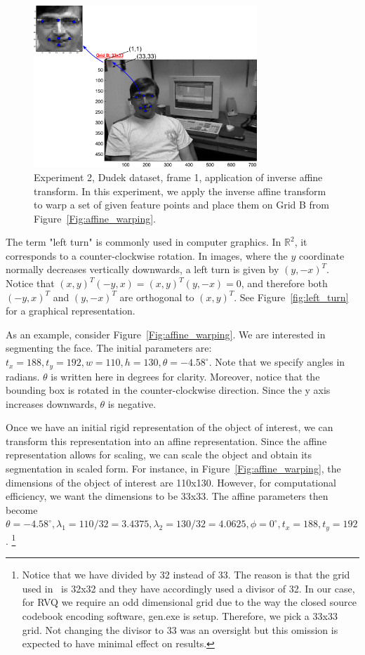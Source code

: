 \begin{enumerate}
								\begin{figure}[t]
								\centering
								\includegraphics[width=0.75\textwidth]{thesis/dataset_Dudek_00001_inverseAffine.pdf}
								\caption{Experiment 2, Dudek dataset, frame 1, application of inverse affine transform.  In this experiment, we apply the inverse affine transform to warp a set of given feature points and place them on Grid B from Figure~\ref{Fig:affine_warping}.}
								\label{fig:original_feature_points}
								\end{figure}


The term "left turn" is commonly used in computer graphics.  In  $\mathbb{R}^2$, it corresponds to a counter-clockwise rotation.  In images, where the $y$ coordinate normally decreases vertically downwards, a left turn is given by $(y,-x)^T$.  Notice that $(x,y)^T(-y,x) = (x,y)^T(y,-x) = 0$, and therefore both $ (-y,x)^T$ and $(y,-x)^T$ are orthogonal to $(x,y)^T$.  See Figure~\ref{fig:left_turn} for a graphical representation.
\end{enumerate}

As an example, consider Figure~\ref{Fig:affine_warping}.  We are interested in segmenting the face.  The initial parameters are: $t_x=188, t_y=192, w=110, h=130, \theta=-4.58^\circ$.  Note that we specify angles in radians.  $\theta$ is written here in degrees for clarity.  Moreover, notice that the bounding box is rotated in the counter-clockwise direction.  Since the y axis increases downwards, $\theta$ is negative.

Once we have an initial rigid representation of the object of interest, we can transform this representation into an affine representation.  Since the affine representation allows for scaling, we can scale the object and obtain its segmentation in scaled form.  For instance, in Figure~\ref{Fig:affine_warping}, the dimensions of the object of interest are 110x130.  However, for computational efficiency, we want the dimensions to be 33x33.  The affine parameters then become $\theta=-4.58^\circ, \lambda_1=110/32=3.4375, \lambda_2=130/32=4.0625, \phi=0^\circ, t_x=188, t_y=192$.  \footnote{Notice that we have divided by 32 instead of 33.  The reason is that the grid used in~\cite{2008_JNL_subspaceTRK_Ross} is 32x32 and they have accordingly used a divisor of 32.  In our case, for RVQ we require an odd dimensional grid due to the way the closed source codebook encoding software, gen.exe is setup.  Therefore, we pick a 33x33 grid.  Not changing the divisor to 33 was an oversight but this omission is expected to have minimal effect on results.}


